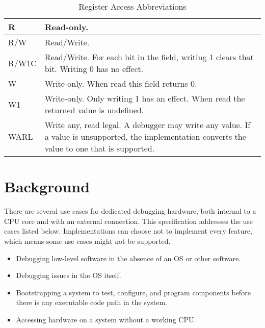 \begin{table}[htp]
    \centering
    \caption{Register Access Abbreviations}
    \label{tab:access}
    \begin{tabulary}{\textwidth}{|l|L|}
        \hline
        R & Read-only. \\
        \hline
        R/W & Read/Write. \\
        \hline
        R/W1C & Read/Write. For each bit in the field, writing 1 clears that bit. Writing 0 has no effect. \\
        \hline
        W & Write-only. When read this field returns 0. \\
        \hline
        W1 & Write-only. Only writing 1 has an effect. When read the returned
        value is undefined. \\
        \hline
        WARL & Write any, read legal. A debugger may write any value. If a
        value is unsupported, the implementation converts the value to one that
        is supported. \\
        \hline
    \end{tabulary}
\end{table}

%

\section{Background}

There are several use cases for dedicated debugging hardware, both
internal to a CPU core and with an external connection.
This specification addresses the use cases listed below. Implementations
can choose not to implement every feature, which means some use cases might
not be supported.

\begin{itemize}

\item Debugging low-level software in the absence of an OS or other software.

\item Debugging issues in the OS itself.

\item Bootstrapping a system to test, configure, and program components before
  there is any executable code path in the system.

\item Accessing hardware on a system without a working CPU.

\end{itemize}

